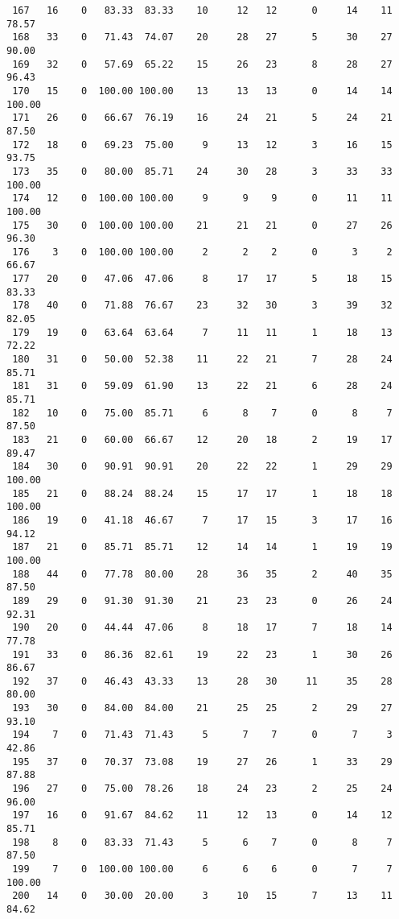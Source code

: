 \begin{verbatim}
 167   16    0   83.33  83.33    10     12   12      0     14    11    78.57
 168   33    0   71.43  74.07    20     28   27      5     30    27    90.00
 169   32    0   57.69  65.22    15     26   23      8     28    27    96.43
 170   15    0  100.00 100.00    13     13   13      0     14    14   100.00
 171   26    0   66.67  76.19    16     24   21      5     24    21    87.50
 172   18    0   69.23  75.00     9     13   12      3     16    15    93.75
 173   35    0   80.00  85.71    24     30   28      3     33    33   100.00
 174   12    0  100.00 100.00     9      9    9      0     11    11   100.00
 175   30    0  100.00 100.00    21     21   21      0     27    26    96.30
 176    3    0  100.00 100.00     2      2    2      0      3     2    66.67
 177   20    0   47.06  47.06     8     17   17      5     18    15    83.33
 178   40    0   71.88  76.67    23     32   30      3     39    32    82.05
 179   19    0   63.64  63.64     7     11   11      1     18    13    72.22
 180   31    0   50.00  52.38    11     22   21      7     28    24    85.71
 181   31    0   59.09  61.90    13     22   21      6     28    24    85.71
 182   10    0   75.00  85.71     6      8    7      0      8     7    87.50
 183   21    0   60.00  66.67    12     20   18      2     19    17    89.47
 184   30    0   90.91  90.91    20     22   22      1     29    29   100.00
 185   21    0   88.24  88.24    15     17   17      1     18    18   100.00
 186   19    0   41.18  46.67     7     17   15      3     17    16    94.12
 187   21    0   85.71  85.71    12     14   14      1     19    19   100.00
 188   44    0   77.78  80.00    28     36   35      2     40    35    87.50
 189   29    0   91.30  91.30    21     23   23      0     26    24    92.31
 190   20    0   44.44  47.06     8     18   17      7     18    14    77.78
 191   33    0   86.36  82.61    19     22   23      1     30    26    86.67
 192   37    0   46.43  43.33    13     28   30     11     35    28    80.00
 193   30    0   84.00  84.00    21     25   25      2     29    27    93.10
 194    7    0   71.43  71.43     5      7    7      0      7     3    42.86
 195   37    0   70.37  73.08    19     27   26      1     33    29    87.88
 196   27    0   75.00  78.26    18     24   23      2     25    24    96.00
 197   16    0   91.67  84.62    11     12   13      0     14    12    85.71
 198    8    0   83.33  71.43     5      6    7      0      8     7    87.50
 199    7    0  100.00 100.00     6      6    6      0      7     7   100.00
 200   14    0   30.00  20.00     3     10   15      7     13    11    84.62

\end{verbatim}
